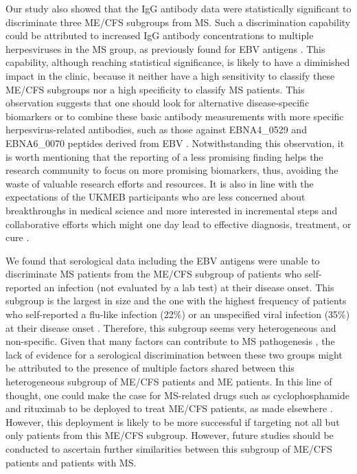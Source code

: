 Our study also showed that the IgG antibody data were statistically significant to discriminate three ME/CFS subgroups from MS. Such a discrimination capability could be attributed to increased IgG antibody concentrations to multiple herpesviruses in the MS group, as previously found for EBV antigens \citep{loebel2017SerologicalProfiling}. This capability, although reaching statistical significance, is likely to have a diminished impact in the clinic, because it neither have a high sensitivity to classify these ME/CFS subgroups nor a high specificity to classify MS patients. This observation suggests that one should look for alternative disease-specific biomarkers or to combine these basic antibody measurements with more specific herpesvirus-related antibodies, such as those against EBNA4\_0529 and EBNA6\_0070 peptides derived from EBV \citep{sepulveda2022RevisitingIgG}. Notwithstanding this observation, it is worth mentioning that the reporting of a less promising finding helps the research community to focus on more promising biomarkers, thus, avoiding the waste of valuable research efforts and resources. It is also in line with the expectations of the UKMEB participants who are less concerned about breakthroughs in medical science and more interested in incremental steps and collaborative efforts which might one day lead to effective diagnosis, treatment, or cure \citep{lacerda2019HopeDisappointment}.

We found that serological data including the EBV antigens were unable to discriminate MS patients from the ME/CFS subgroup of patients who self-reported an infection (not evaluated by a lab test) at their disease onset. This subgroup is the largest in size and the one with the highest frequency of patients who self-reported a flu-like infection (22\%) or an unspecified viral infection (35\%) at their disease onset \citep{domingues2021HerpesvirusesSerologya}. Therefore, this subgroup seems very heterogeneous and non-specific. Given that many factors can contribute to MS pathogenesis \citep{marcocci2020HerpesSimplex}, the lack of evidence for a serological discrimination between these two groups might be attributed to the presence of multiple factors shared between this heterogeneous subgroup of ME/CFS patients and ME patients. In this line of thought, one could make the case for MS-related drugs such as cyclophosphamide \citep{patti2011LightsShadows} and rituximab \citep{brancati2021RituximabMultiple} to be deployed to treat ME/CFS patients, as made elsewhere \citep{flugeBLymphocyteDepletionPatients2019, rekeland2020IntravenousCyclophosphamide}. However, this deployment is likely to be more successful if targeting not all but only patients from this ME/CFS subgroup. However, future studies should be conducted to ascertain further similarities between this subgroup of ME/CFS patients and patients with MS.

